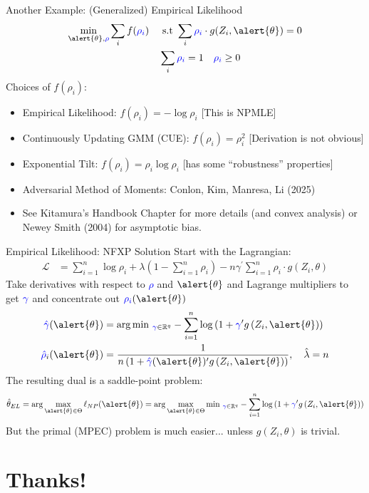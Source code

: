 \documentclass[aspectratio=169,11pt]{beamer}
\begin{document}
\begin{frame}{Another Example: (Generalized) Empirical Likelihood}
\begin{align*}
\min_{\alert{\theta}, \textcolor{blue}{\rho} }\sum_i f(\textcolor{blue}{\rho_i}) \quad &\text{ s.t } \sum_i \textcolor{blue}{\rho_i} \cdot g(Z_i,\alert{\theta})= 0\\
& \sum_i \textcolor{blue}{\rho_i} =1 \quad \textcolor{blue}{\rho_i} \geq 0
\end{align*}
Choices of $f(\rho_i)$:
\begin{itemize}
\item Empirical Likelihood: $f(\rho_i) = - \log \rho_i$ [This is NPMLE]
\item Continuously Updating GMM (CUE): $f(\rho_i) = \rho_i^2$ [Derivation is \alert{not} obvious]
\item Exponential Tilt: $f(\rho_i) = \rho_i \log \rho_i $ [has some ``robustness'' properties]
\item Adversarial Method of Moments: Conlon, Kim, Manresa, Li (2025)
\item See Kitamura's Handbook Chapter for more details (and convex analysis) or Newey Smith (2004) for asymptotic bias.
\end{itemize}
\end{frame}


\begin{frame}{Empirical Likelihood: NFXP Solution}
Start with the Lagrangian:
\begin{align*}
\mathcal{L} &=\sum_{i=1}^{n} \log \rho_{i}+\lambda\left(1-\sum_{i=1}^{n} \rho_{i}\right)-n \gamma^{\prime} \sum_{i=1}^{n} \rho_{i}\cdot g\left(Z_{i}, \theta\right)
\end{align*}
Take derivatives with respect to \textcolor{blue}{$\rho$} and $\alert{\theta}$ and Lagrange multipliers to get $\textcolor{blue}{\gamma}$ and concentrate out $\textcolor{blue}{\rho_i}(\alert{\theta})$
\begin{align*}
\textcolor{blue}{\hat{\gamma}}(\alert{\theta}) &=\arg \min\, _{\textcolor{blue}{\gamma} \in \mathbb{R}^{q}}-
\sum_{i=1}^{n} \log \left(1+\textcolor{blue}{\gamma}^{\prime} g\left(Z_{i}, \alert{\theta}\right)\right) \\
\textcolor{blue}{\hat{\rho}}_{i}(\alert{\theta}) &=\frac{1}{n\left(1+\textcolor{blue}{\hat{\gamma}}(\alert{\theta})^{\prime} g\left(Z_{i}, \alert{\theta}\right)\right)}, \quad \hat{\lambda}=n
\end{align*}
The resulting dual is a saddle-point problem:
\begin{align*}
\hat{\theta}_{E L}=\arg \max _{\alert{\theta} \in \Theta} \ell_{N P}(\alert{\theta})=\arg \max _{\alert{\theta} \in \Theta} \min\, _{\textcolor{blue}{\gamma} \in \mathbb{R}^{q}}-\sum_{i=1}^{n} \log \left(1+\textcolor{blue}{\gamma}^{\prime} g\left(Z_{i}, \alert{\theta}\right)\right)
\end{align*}
But the primal (MPEC) problem is much easier... unless $g(Z_i,\theta)$ is trivial.
\end{frame}

\section{Thanks!}
\end{document}
